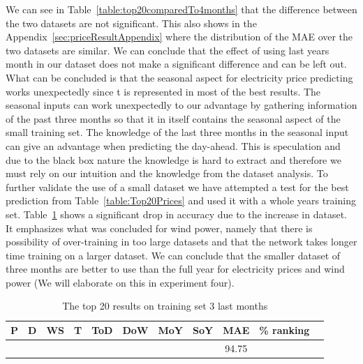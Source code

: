We can see in Table~\ref{table:top20comparedTo4months} that the difference between the two datasets are not significant. This also shows in the Appendix~\ref{sec:priceResultAppendix} where the distribution of the MAE over the two datasets are similar. We can conclude that the effect of using last years month in our dataset does not make a significant difference and can be left out. What can be concluded is that the seasonal aspect for electricity price predicting works unexpectedly since t is represented in most of the best results. The seasonal inputs can work unexpectedly to our advantage by gathering information of the past three months so that it in itself contains the seasonal aspect of the small training set. The knowledge of the last three months in the seasonal input can give an advantage when predicting the day-ahead. This is speculation and due to the black box nature the knowledge is hard to extract and therefore we must rely on our intuition and the knowledge from the dataset analysis. To further validate the use of a small dataset we have attempted a test for the best prediction from Table~\ref{table:Top20Prices} and used it with a whole years training set. Table~\ref{table:1YearTrain} shows a significant drop in accuracy due to the increase in dataset. It emphasizes what was concluded for wind power, namely that there is possibility of over-training in too large datasets\cite{1} and that the network takes longer time training on a larger dataset. We can conclude that the smaller dataset of three months are better to use than the full year for electricity prices and wind power (We will elaborate on this in experiment four).  

\begin{table}[H]
\centering  %
\begin{tabular}{|c|c|c|c|c|c|c|c|c|c|c|} %
\hline
P & D & WS & T & ToD & DoW & MoY & SoY & MAE & \% ranking\\ [0.5ex] %
\hline
\x    & \x    & \x    & \x    & \x\m  & \x\m  &   & \x\m  & 94.75 & \\ \hline
\end{tabular}
\caption{The top 20 results on training set 3 last months} %
\label{table:1YearTrain} %
\end{table}

